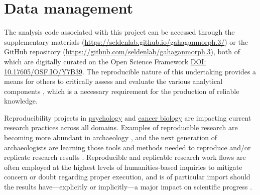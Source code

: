 \documentclass[]{interact}
\theoremstyle{plain}%
\theoremstyle{definition}
\theoremstyle{remark}
\begin{document}
\hypertarget{data-management}{%
\section*{Data management}\label{data-management}}

The analysis code associated with this project can be accessed through
the supplementary materials
(\url{https://seldenlab.github.io/gahaganmorph.3/}) or the GitHub
repository (\url{https://github.com/seldenlab/gahaganmorph.3}), both of
which are digitally curated on the Open Science Framework
\href{https://osf.io/y7b39/}{DOI: 10.17605/OSF.IO/Y7B39}. The
reproducible nature of this undertaking provides a means for others to
critically assess and evaluate the various analytical components
\citep{RN8312,RN8313,RN8299}, which is a necessary requirement for the
production of reliable knowledge.

Reproducibility projects in \href{https://osf.io/ezcuj/}{psychology} and
\href{https://www.cos.io/rpcb}{cancer biology} are impacting current
research practices across all domains. Examples of reproducible research
are becoming more abundant in archaeology
\citep{RN8207,RN8965,RN8154,RN8318,RN9364,RN11064}, and the next
generation of archaeologists are learning those tools and methods needed
to reproduce and/or replicate research results \citep{RN10760}.
Reproducible and replicable research work flows are often employed at
the highest levels of humanities-based inquiries to mitigate concern or
doubt regarding proper execution, and is of particular import should the
results have---explicitly or implicitly---a major impact on scientific
progress \citep{RN10761}.






\end{document}
